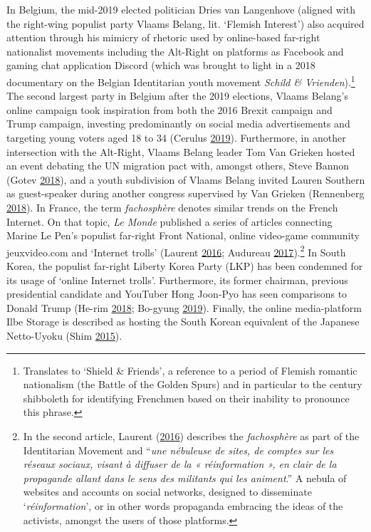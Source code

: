\documentclass[10pt,british,A4paper,twoside]{memoir}
\begin{document}
In Belgium, the mid-2019 elected politician Dries van Langenhove
(aligned with the right-wing populist party Vlaams Belang, lit. `Flemish
Interest') also acquired attention through his mimicry of rhetoric used
by online-based far-right nationalist movements including the Alt-Right
on platforms as Facebook and gaming chat application Discord (which was
brought to light in a 2018 documentary on the Belgian Identitarian youth
movement \emph{Schild \& Vrienden}).\footnote{Translates to `Shield \&
  Friends', a reference to a period of Flemish romantic nationalism (the
  Battle of the Golden Spurs) and in particular to the  century
  shibboleth for identifying Frenchmen based on their inability to
  pronounce this phrase.} The second largest party in Belgium after the
2019 elections, Vlaams Belang's online campaign took inspiration from
both the 2016 Brexit campaign and Trump campaign, investing predominantly
on social media advertisements and targeting young voters aged 18 to 34
(Cerulus \protect\hyperlink{ref-cerulus_inside_2019}{2019}).
Furthermore, in another intersection with the Alt-Right, Vlaams Belang
leader Tom Van Grieken hosted an event debating the UN migration pact
with, amongst others, Steve Bannon (Gotev
\protect\hyperlink{ref-gotev_vlaams_2018}{2018}), and a youth
subdivision of Vlaams Belang invited Lauren Southern as guest-speaker
during another congress supervised by Van Grieken (Rennenberg
\protect\hyperlink{ref-rennenberg_vlaams_2018}{2018}). In France, the
term \emph{fachosphère} denotes similar trends on the French Internet. On that topic, \emph{Le Monde} published a series of articles 
connecting Marine Le Pen's populist far-right Front National, online
video-game community jeuxvideo.com and `Internet trolls' (Laurent
\protect\hyperlink{ref-laurent_nordactu_2016}{2016}; Audureau
\protect\hyperlink{ref-audureau_les_2017}{2017}).\footnote{In the second
  article, Laurent (\protect\hyperlink{ref-laurent_nordactu_2016}{2016})
  describes the \emph{fachosphère} as part of the Identitarian Movement
  and ``\emph{une nébuleuse de sites, de comptes sur les réseaux
  sociaux, visant à diffuser de la « réinformation », en clair de la
  propagande allant dans le sens des militants qui les animent}.'' A
  nebula of websites and accounts on social networks, designed to
  disseminate `\emph{réinformation}', or in other words propaganda
  embracing the ideas of the activists, amongst the users of those
  platforms.} In South Korea, the populist far-right Liberty Korea Party
(LKP) has been condemned for its usage of `online Internet trolls'.
Furthermore, its former chairman, previous presidential candidate and
YouTuber Hong Joon-Pyo has seen comparisons to Donald Trump (He-rim
\protect\hyperlink{ref-he-rim_firebrand_2018}{2018}; Bo-gyung
\protect\hyperlink{ref-bo-gyung_youtube_2019}{2019}). Finally, the
online media-platform Ilbe Storage is described as hosting the South
Korean equivalent of the Japanese Netto-Uyoku (Shim
\protect\hyperlink{ref-shim_hardcore_2015}{2015}).
\end{document}
